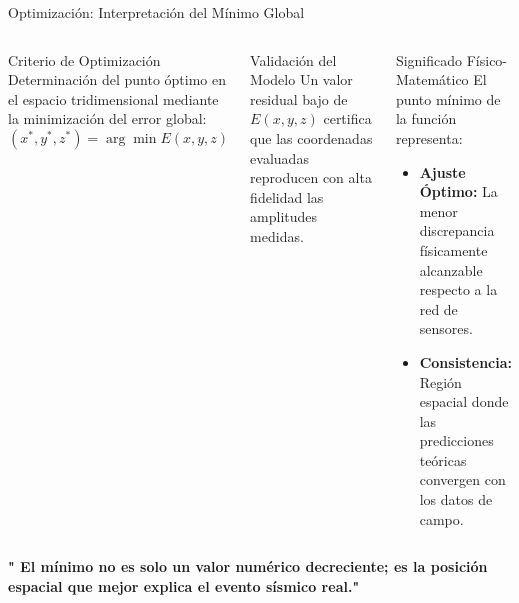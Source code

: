 
\begin{frame}{Optimización: Interpretación del Mínimo Global}

    \begin{columns}[T]
        \begin{block}{Criterio de Optimización}
            \scriptsize
            Determinación del punto óptimo en el espacio tridimensional mediante la minimización del error global:
            \vspace{0.3cm}
            \[
            (x^*, y^*, z^*) = \arg\min E(x,y,z)
            \]
            \vspace{0.2cm}
        \end{block}

        \vspace{0.2cm}

        \begin{block}{Validación del Modelo}
            \scriptsize
            Un valor residual bajo de $E(x,y,z)$ certifica que las coordenadas evaluadas reproducen con alta fidelidad las amplitudes medidas.
        \end{block}

        \begin{exampleblock}{Significado Físico-Matemático}
            \scriptsize
            El punto mínimo de la función representa:
            \begin{itemize}
                \item \textbf{Ajuste Óptimo:} La menor discrepancia físicamente alcanzable respecto a la red de sensores.
                \vspace{0.3cm}
                \item \textbf{Consistencia:} Región espacial donde las predicciones teóricas convergen con los datos de campo.
            \end{itemize}
        \end{exampleblock}
    \end{columns}

    \vspace{0.5cm}

    \begin{center}
        \footnotesize
        \textbf{"   El mínimo no es solo un valor numérico decreciente; es la posición espacial que mejor explica el evento sísmico real."}
    \end{center}

\end{frame}